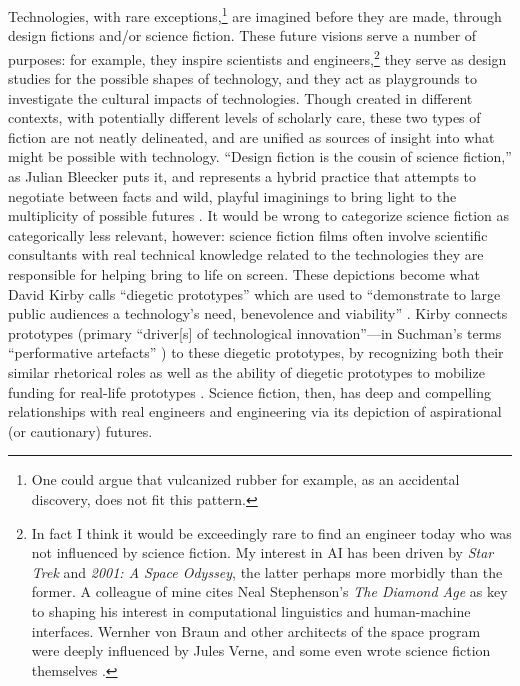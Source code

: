 Technologies, with rare exceptions,\footnote{One could argue that
  vulcanized rubber for example, as an accidental discovery, does not
  fit this pattern.} are imagined before they are made, through design
fictions and/or science fiction. These future
visions serve a number of purposes: for example, they inspire scientists and
engineers,\footnote{In fact I think it would be exceedingly rare to
  find an engineer today who was not influenced by science fiction. My
  interest in AI has been driven by \emph{Star Trek} and \emph{2001: A
  Space Odyssey}, the latter perhaps more morbidly than the former. A
  colleague of mine cites Neal Stephenson's
  \emph{The Diamond Age} as key to shaping his interest in
  computational linguistics and human-machine interfaces. Wernher von
  Braun and other architects of the space program were deeply
  influenced by Jules Verne, and some even wrote science fiction
  themselves \cite[p. 2]{marketingMoon}.} they serve as design
studies for the possible shapes of technology, and they act as
playgrounds to investigate the cultural impacts of technologies.
Though created in different contexts, with potentially 
different levels of scholarly care, these two types of fiction are not
neatly delineated, and are unified as sources of insight into what
might be possible with technology. ``Design fiction is the cousin of
science fiction,'' as Julian Bleecker puts it, and represents a hybrid
practice that attempts to negotiate between facts and wild, playful
imaginings to bring light to the multiplicity of possible
futures \cite[p. 8]{bleecker}. It would be wrong to categorize science
fiction as categorically less relevant, however: science fiction
films
often involve scientific consultants with real
technical knowledge related to the technologies they are responsible for
helping bring to life on screen. These depictions become what David
Kirby calls ``diegetic prototypes'' which are used to ``demonstrate to
large public audiences a technology's need, benevolence and
viability'' \cite[p. 43]{kirbyFuture}. Kirby connects prototypes (primary
``driver[s] of technological innovation''---in
Suchman's terms ``performative artefacts'' \cite[p. 45]{kirbyFuture})
to these diegetic prototypes, 
by recognizing both their similar rhetorical roles as well as the
ability of diegetic prototypes to mobilize funding for real-life
prototypes \cite[p. 44-47]{kirbyFuture}. Science fiction, then, has deep
and compelling relationships with real engineers and engineering via
its depiction of aspirational (or cautionary) futures.

